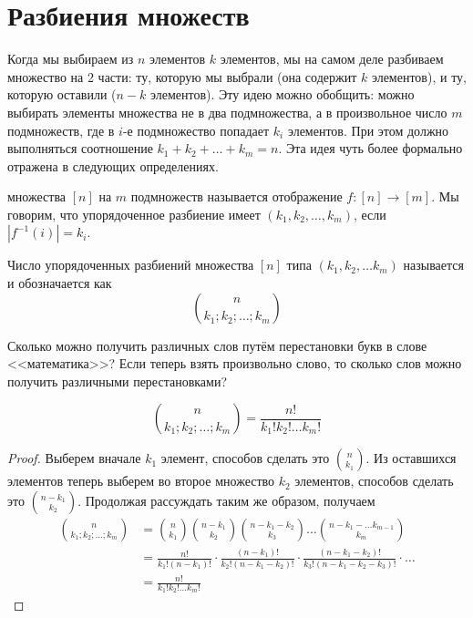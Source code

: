 \section{Разбиения множеств}

Когда мы выбираем из $n$ элементов $k$ элементов, мы на самом деле разбиваем множество на 2 части: ту, которую мы выбрали (она содержит $k$ элементов), и ту, которую оставили ($n-k$ элементов). Эту идею можно обобщить: можно выбирать элементы множества не в два подмножества, а в произвольное число $m$ подмножеств, где в $i$-е подмножество попадает $k_i$ элементов. При этом должно выполняться соотношение $k_1+k_2+\ldots+k_m = n$. Эта идея чуть более формально отражена в следующих определениях.

\begin{definition}
 множества $[n]$ на $m$ подмножеств называется отображение $f:[n]\to[m]$. Мы говорим, что упорядоченное разбиение имеет  $(k_1, k_2, \ldots, k_m)$, если $|f^{-1}(i)| = k_i$.
\end{definition}

\begin{definition}
Число упорядоченных разбиений множества $[n]$ типа $(k_1, k_2, \ldots k_m)$ называется  и обозначается как
$$n \choose k_1; k_2;\ldots; k_m$$
\end{definition}

\begin{exercise}
Сколько можно получить различных слов путём перестановки букв в слове <<математика>>? Если теперь взять произвольно слово, то сколько слов можно получить различными перестановками?
\end{exercise}

\begin{thm}
$${n \choose k_1; k_2;\ldots; k_m} = \frac{n!}{k_1!k_2!\ldots k_m!}$$
\end{thm}
\begin{proof}
Выберем вначале $k_1$ элемент, способов сделать это $n\choose k_1$. Из оставшихся элементов теперь выберем во второе множество $k_2$ элементов, способов сделать это $n-k_1\choose k_2$. Продолжая рассуждать таким же образом, получаем
\begin{align*}
{n \choose k_1; k_2;\ldots; k_m} & = {n\choose k_1}{n-k_1\choose k_2}{n-k_1-k_2\choose k_3}\ldots{n-k_1-\ldots k_{m-1}\choose k_m} \\
&= \frac{n!}{k_1!(n-k_1)!}\cdot\frac{(n-k_1)!}{k_2!(n-k_1-k_2)!}\cdot\frac{(n-k_1-k_2)!}{k_3!(n-k_1-k_2-k_3)!}\cdot\ldots\\
&=\frac{n!}{k_1!k_2!\ldots k_m!}
\end{align*}
\end{proof}

